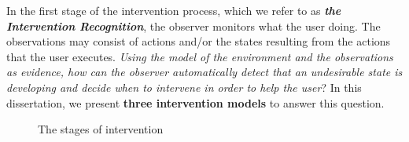 In the first stage of the intervention process, which we refer to as \textit{\textbf{the Intervention Recognition}}, the observer monitors what the user doing.
The observations may consist of actions and/or the states resulting from the actions that the user executes. 
\textit{Using the model of the environment and the observations as evidence, how can the observer automatically detect that an undesirable state is developing and decide when to intervene in order to help the user}? In this dissertation, we present \textbf{three intervention models} to answer this question.
\begin{figure}[ptb]
   \caption{The stages of intervention}
\label{fig:stages}
\end{figure}

